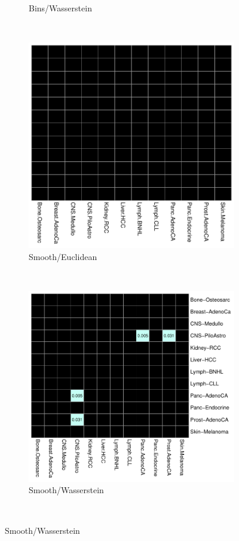 \begin{figure}[ht!]
\begin{subfigure}{.55\textwidth}
    \caption{Bins/Wasserstein}
    \label{fig:bootstrap_bins_wasserstein}
    \end{subfigure} \\
    \vspace{0.5cm}
    
    \begin{subfigure}{.45\textwidth}
    \includegraphics[scale=0.65]{graphics/bootstrap_smooth_euclidean.pdf}
    \caption{Smooth/Euclidean}
    \label{fig:bootstrap_smooth_euclidean}
    \end{subfigure}
    ~
    \begin{subfigure}{.55\textwidth}
    \includegraphics[scale=0.65]{graphics/bootstrap_smooth_wasserstein.pdf}
    \caption{Smooth/Wasserstein}
    \label{fig:smooth_wasserstein}
    \end{subfigure} \\
    

\end{figure}
